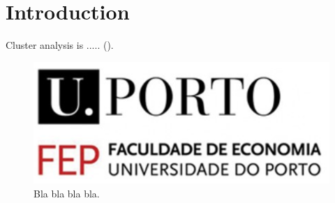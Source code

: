 \chapter{\textbf{Introduction}}  \label{introduction}

Cluster analysis is ..... (\cite{liao2005clustering}). 


\begin{figure}[h!]
    \centering
    \includegraphics[scale=0.8]{images/FEP.PNG}
    \caption{Bla bla bla bla.}
\label{fig: labelX}
\end{figure}
